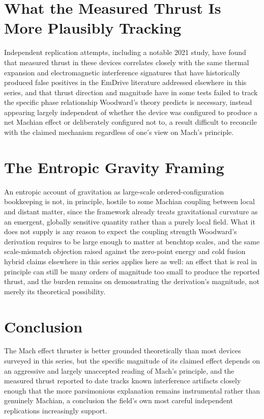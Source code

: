 \documentclass[11pt]{article}
\begin{document}
\section{What the Measured Thrust Is More Plausibly Tracking}

Independent replication attempts, including a notable 2021 study, have found that measured thrust in these devices correlates closely with the same thermal expansion and electromagnetic interference signatures that have historically produced false positives in the EmDrive literature addressed elsewhere in this series, and that thrust direction and magnitude have in some tests failed to track the specific phase relationship Woodward's theory predicts is necessary, instead appearing largely independent of whether the device was configured to produce a net Machian effect or deliberately configured not to, a result difficult to reconcile with the claimed mechanism regardless of one's view on Mach's principle.

\section{The Entropic Gravity Framing}

An entropic account of gravitation as large-scale ordered-configuration bookkeeping is not, in principle, hostile to some Machian coupling between local and distant matter, since the framework already treats gravitational curvature as an emergent, globally sensitive quantity rather than a purely local field. What it does not supply is any reason to expect the coupling strength Woodward's derivation requires to be large enough to matter at benchtop scales, and the same scale-mismatch objection raised against the zero-point energy and cold fusion hybrid claims elsewhere in this series applies here as well: an effect that is real in principle can still be many orders of magnitude too small to produce the reported thrust, and the burden remains on demonstrating the derivation's magnitude, not merely its theoretical possibility.

\section{Conclusion}

The Mach effect thruster is better grounded theoretically than most devices surveyed in this series, but the specific magnitude of its claimed effect depends on an aggressive and largely unaccepted reading of Mach's principle, and the measured thrust reported to date tracks known interference artifacts closely enough that the more parsimonious explanation remains instrumental rather than genuinely Machian, a conclusion the field's own most careful independent replications increasingly support.
\end{document}

